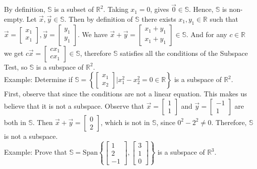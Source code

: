 \documentclass[10pt,letter]{article}
\begin{document}
By definition, $\mathbb{S}$ is a subset of $\mathbb{R}^2$. Taking $x_1=0$, gives $\vec{0}\in\mathbb{S}$. Hence, $\mathbb{S}$ is non-empty. Let $\vec{x},\vec{y}\in\mathbb{S}$. Then by definition of $\mathbb{S}$ there exists $x_1,y_1\in\mathbb{R}$ such that $\vec{x}=\begin{bmatrix}x_1\\x_1\end{bmatrix},\vec{y}=\begin{bmatrix}y_1\\y_1\end{bmatrix}$. We have $\vec{x}+\vec{y}=\begin{bmatrix}x_1+y_1\\x_1+y_1\end{bmatrix}\in\mathbb{S}$. And for any $c\in\mathbb{R}$ we get $c\vec{x}=\begin{bmatrix}cx_1\\cx_1\end{bmatrix}\in\mathbb{S}$, therefore $\mathbb{S}$ satisfies all the conditions of the Subspace Test, so $\mathbb{S}$ is a subspace of $\mathbb{R}^2$. \\ 
Example: Determine if $\mathbb{S}=\left\{\begin{bmatrix}x_1\\x_2\end{bmatrix}|x_1^2-x_2^2=0\in\mathbb{R}\right\}$ is a subspace of $\mathbb{R}^2$. \\ 
First, observe that since the conditions are not a linear equation. This makes us believe that it is not a subspace. Observe that $\vec{x}=\begin{bmatrix}1\\1\end{bmatrix}$ and $\vec{y}=\begin{bmatrix}-1\\1\end{bmatrix}$ are both in $\mathbb{S}$. Then $\vec{x}+\vec{y}=\begin{bmatrix}0\\2\end{bmatrix}$, which is not in $\mathbb{S}$, since $0^2-2^2\neq0$. Therefore, $\mathbb{S}$ is not a subspace. \\ 
Example: Prove that $\mathbb{S}=\text{Span}\left\{\begin{bmatrix}1\\2\\-1\end{bmatrix},\begin{bmatrix}3\\1\\0\end{bmatrix}\right\}$ is a subspace of $\mathbb{R}^3$. \\ 
\end{document}
